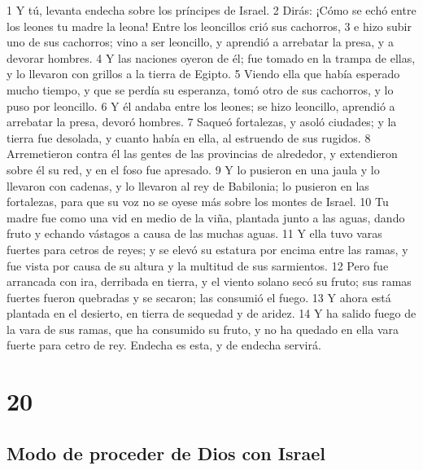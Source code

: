 1 Y tú, levanta endecha sobre los príncipes de Israel.
2 Dirás: ¡Cómo se echó entre los leones tu madre la leona! Entre los leoncillos crió sus cachorros,
3 e hizo subir uno de sus cachorros; vino a ser leoncillo, y aprendió a arrebatar la presa, y a devorar hombres.
4 Y las naciones oyeron de él; fue tomado en la trampa de ellas, y lo llevaron con grillos a la tierra de Egipto.
5 Viendo ella que había esperado mucho tiempo, y que se perdía su esperanza, tomó otro de sus cachorros, y lo puso por leoncillo.
6 Y él andaba entre los leones; se hizo leoncillo, aprendió a arrebatar la presa, devoró hombres.
7 Saqueó fortalezas, y asoló ciudades; y la tierra fue desolada, y cuanto había en ella, al estruendo de sus rugidos.
8 Arremetieron contra él las gentes de las provincias de alrededor, y extendieron sobre él su red, y en el foso fue apresado.
9 Y lo pusieron en una jaula y lo llevaron con cadenas, y lo llevaron al rey de Babilonia; lo pusieron en las fortalezas, para que su voz no se oyese más sobre los montes de Israel.
10 Tu madre fue como una vid en medio de la viña, plantada junto a las aguas, dando fruto y echando vástagos a causa de las muchas aguas.
11 Y ella tuvo varas fuertes para cetros de reyes; y se elevó su estatura por encima entre las ramas, y fue vista por causa de su altura y la multitud de sus sarmientos.
12 Pero fue arrancada con ira, derribada en tierra, y el viento solano secó su fruto; sus ramas fuertes fueron quebradas y se secaron; las consumió el fuego.
13 Y ahora está plantada en el desierto, en tierra de sequedad y de aridez.
14 Y ha salido fuego de la vara de sus ramas, que ha consumido su fruto, y no ha quedado en ella vara fuerte para cetro de rey. Endecha es esta, y de endecha servirá.

\chapter{20}

\section*{Modo de proceder de Dios con Israel}

